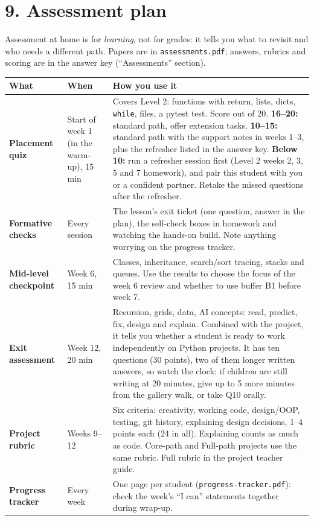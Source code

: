 \documentclass[level=3,teacher]{kidscode}
\begin{document}
\section{9. Assessment plan}

Assessment at home is for \emph{learning}, not for grades: it tells you what to revisit and who
needs a different path. Papers are in \texttt{assessments.pdf}; answers, rubrics and scoring are
in the answer key (\enquote{Assessments} section).

\begin{longtable}{@{}>{\bfseries}p{2.9cm}>{\raggedright\arraybackslash}p{2.2cm}p{\dimexpr\linewidth-5.1cm-4\tabcolsep}@{}}
\toprule
\rowcolor{kcaccent!15} What & When & How you use it\\ \midrule\endhead
\bottomrule\endfoot
Placement quiz & Start of week 1 (in the warm-up), 15 min & Covers Level 2:
functions with return, lists, dicts, \texttt{while}, files, a pytest test. Score out of 20.
\textbf{16--20:} standard path, offer extension tasks. \textbf{10--15:} standard path with the
support notes in weeks 1--3, plus the refresher listed in the answer key. \textbf{Below 10:} run a
refresher session first (Level 2 weeks 2, 3, 5 and 7 homework), and pair this student with you
or a confident partner. Retake the missed questions after the refresher.\\ \midrule
Formative checks & Every session & The lesson's exit ticket (one question, answer in the plan),
the self-check boxes in homework and watching the hands-on build. Note anything worrying on the
progress tracker.\\ \midrule
Mid-level checkpoint & Week 6, 15 min & Classes, inheritance, search/sort tracing, stacks and
queues. Use the results to choose the focus of the week 6 review and whether to use buffer B1
before week 7.\\ \midrule
Exit assessment & Week 12, 20 min & Recursion, grids, data, AI concepts: read, predict, fix,
design and explain. Combined with the project, it tells you whether a student is ready to work
independently on Python projects. It has ten questions (30 points), two of them longer written
answers, so watch the clock: if children are still writing at 20 minutes, give up to 5 more minutes
from the gallery walk, or take Q10 orally.\\ \midrule
Project rubric & Weeks 9--12 & Six criteria: creativity, working code, design/OOP, testing, git
history, explaining design decisions, 1--4 points each (24 in all). Explaining counts as much as
code. Core-path and Full-path projects use the same rubric. Full rubric in the project teacher
guide.\\ \midrule
Progress tracker & Every week & One page per student (\texttt{progress-tracker.pdf}): check the
week's \enquote{I can} statements together during wrap-up.\\
\end{longtable}
\end{document}
